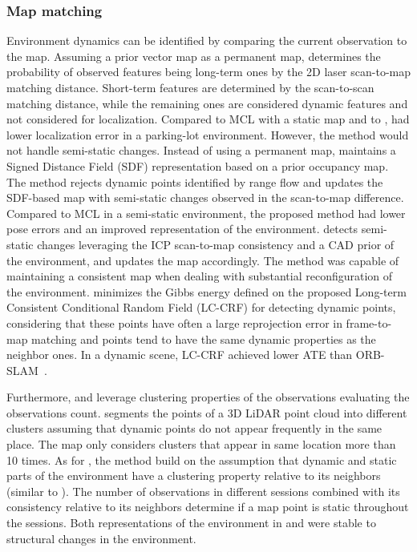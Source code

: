 \subsubsection{Map matching}

Environment dynamics can be identified by comparing the current observation to the map.
Assuming a prior vector map as a permanent map, \cite{biswas-veloso:2017:005} determines the probability of observed features being long-term ones by the 2D laser scan-to-map matching distance. Short-term features are determined by the scan-to-scan matching distance, while the remaining ones are considered dynamic features and not considered for localization. Compared to MCL with a static map and to \cite{tipaldi-et-al:2013:0278364913502830}, \cite{biswas-veloso:2017:005} had lower localization error in a parking-lot environment. However, the method would not handle semi-static changes.
Instead of using a permanent map, \cite{zhang-et-al:2019:8814347} maintains a Signed Distance Field (SDF) representation based on a prior occupancy map. The method rejects dynamic points identified by range flow and updates the SDF-based map with semi-static changes observed in the scan-to-map difference. Compared to MCL in a semi-static environment, the proposed method had lower pose errors and an improved representation of the environment.
\cite{boniardi-et-al:2019:003} detects semi-static changes leveraging the ICP scan-to-map consistency and a CAD prior of the environment, and updates the map accordingly. The method was capable of maintaining a consistent map when dealing with substantial reconfiguration of the environment.
\cite{du-et-al:2022:3028218} minimizes the Gibbs energy defined on the proposed Long-term Consistent Conditional Random Field (LC-CRF) for detecting dynamic points, considering that these points have often a large reprojection error in frame-to-map matching and points tend to have the same dynamic properties as the neighbor ones. In a dynamic scene, LC-CRF achieved lower ATE than ORB-SLAM~\parencite{mur-artal-et-al:2015:2463671}.

Furthermore, \cite{pan-et-al:2019:s19194252} and \cite{ding-et-al:2020:2942760} leverage clustering properties of the observations evaluating the observations count.
\cite{pan-et-al:2019:s19194252} segments the points of a 3D LiDAR point cloud into different clusters assuming that dynamic points do not appear frequently in the same place. The map only considers clusters that appear in same location more than 10 times.
As for \cite{ding-et-al:2020:2942760}, the method build on the assumption that dynamic and static parts of the environment have a clustering property relative to its neighbors (similar to \cite{du-et-al:2022:3028218}). The number of observations in different sessions combined with its consistency relative to its neighbors determine if a map point is static throughout the sessions.
Both representations of the environment in \cite{pan-et-al:2019:s19194252} and \cite{ding-et-al:2020:2942760} were stable to structural changes in the environment.

